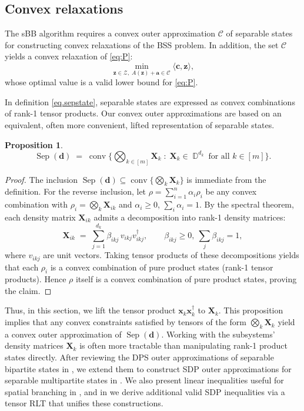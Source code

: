 \documentclass[smallextended]{svjour3}
\newtheorem{proposition}{Proposition}
\newcommand{\cZ}{\mathcal Z}
\newcommand{\cC}{\mathcal C}
\DeclareMathOperator{\conv}{conv}
\DeclareMathOperator{\sep}{Sep}
\DeclareMathOperator{\dmat}{\mathbb{D}}
\newcommand{\X}{\mathbf{X}}
\newcommand{\1}{\mathbf{1}}
\renewcommand{\X}{\mathbf{X}}
\newcommand{\x}{\mathbf{x}}
\newcommand{\z}{\mathbf{z}}
\newcommand{\bc}{\mathbf{c}}
\renewcommand{\a}{\mathbf{a}}
\DeclareMathOperator{\bmtens}{\bigotimes}
\newcommand{\vc}[1]{\mathbf{#1}}
\newcommand{\vd}{\vc{d}}
\begin{document}
\subsection{Convex relaxations}
\label{sec.rel}

The sBB algorithm requires a convex outer approximation $\cC$ of separable states for constructing convex relaxations of the BSS problem. In addition, the set $\cC$ yields a convex relaxation of  \eqref{eq:P}:
\begin{equation}
\label{eq:PR}
     \min_{\z \in \cZ,\; A(\z) + \a \in \cC} \langle\bc,\z\rangle,
\end{equation}
   whose optimal value is a valid lower bound for \eqref{eq:P}.

In definition \eqref{eq.sepstate}, separable states are expressed as convex combinations of rank-1 tensor products.
Our convex outer approximations are based on an equivalent, often more convenient, lifted representation of separable states.

\begin{proposition}
\label{prop.state}
    \[
        \sep(\vd) \;=\; \conv\bigl\{ \bmtens_{k\in[m]}\X_k \;:\; \X_k\in\dmat^{d_k}\ \text{for all }k\in[m]\bigr\}.
    \]
\end{proposition}
\begin{proof}
    The inclusion $\sep(\vd)\subseteq\conv\{\bmtens_{k}\X_k\}$ is immediate from the definition. For the reverse inclusion, let
    $\rho=\sum_{i=1}^n\alpha_i \rho_i$ be any convex combination with $\rho_i=\bmtens_{k}\X_{ik}$ and $\alpha_i\ge0$, $\sum_i\alpha_i=1$.
    By the spectral theorem, each density matrix $\X_{ik}$ admits a decomposition into rank-1 density matrices:
    \[
        \X_{ik} \;=\; \sum_{j=1}^{d_k} \beta_{ikj}\, v_{ikj}v_{ikj}^\dagger,
        \qquad \beta_{ikj}\ge0,\ \sum_j\beta_{ikj}=1,
    \]
    where $v_{ikj}$ are unit vectors. Taking tensor products of these decompositions yields that each $\rho_i$ is a convex combination of pure product states (rank-1 tensor products). Hence $\rho$ itself is a convex combination of pure product states, proving the claim.
\end{proof}

Thus,
in this section, we lift the tensor product $\x_k\x_k^\dagger$ to $\X_k$.
This proposition implies that any convex constraints satisfied by tensors of the form $\bmtens_{k}\X_k$ yield a convex outer approximation of $\sep(\vd)$. Working with the subsystems' density matrices $\X_k$ is often more tractable than manipulating rank-1 product states directly. After reviewing the DPS outer approximations of  separable bipartite states in , we extend them to construct SDP  outer approximations for separable multipartite states in . We also present linear inequalities useful for spatial branching in , and in  we derive additional valid SDP inequalities via a tensor RLT that unifies these constructions.
\end{document}
